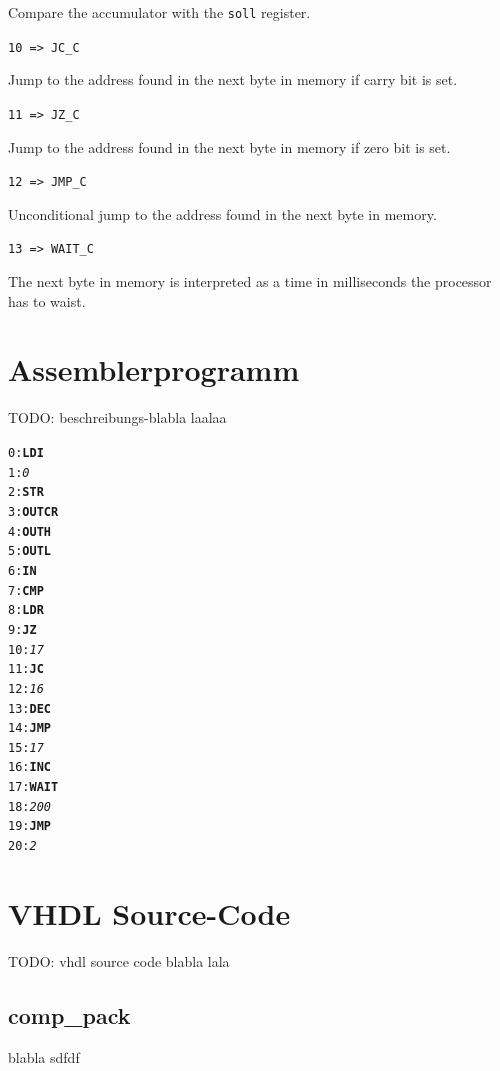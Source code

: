 \documentclass[a4paper,10pt]{scrartcl}
\begin{document}
Compare the accumulator with the \texttt{soll} register.

\noindent\texttt{10  =>  JC\_C}

Jump to the address found in the next byte in memory if carry bit is set.

\noindent\texttt{11  =>  JZ\_C}

Jump to the address found in the next byte in memory if zero bit is set.

\noindent\texttt{12  =>  JMP\_C}

Unconditional jump to the address found in the next byte in memory.

\noindent\texttt{13  =>  WAIT\_C}

The next byte in memory is interpreted as a time in milliseconds the
processor has to waist.



\section{Assemblerprogramm}
\label{sec:ass_prog}


TODO: beschreibungs-blabla laalaa


\begin{alltt}\footnotesize
 0: \textbf{LDI }
 1: \textit{0}
 2: \textbf{STR}
 3: \textbf{OUTCR}
 4: \textbf{OUTH}
 5: \textbf{OUTL}
 6: \textbf{IN}
 7: \textbf{CMP}
 8: \textbf{LDR}
 9: \textbf{JZ }
10: \textit{17}
11: \textbf{JC }
12: \textit{16}
13: \textbf{DEC}
14: \textbf{JMP }
15: \textit{17}
16: \textbf{INC}
17: \textbf{WAIT }
18: \textit{200}
19: \textbf{JMP }
20: \textit{2}
\end{alltt}



\section{VHDL Source-Code}
\label{sec:vhdl}


TODO: vhdl source code blabla lala

\subsection{comp\_pack}
blabla sdfdf


\end{document}
